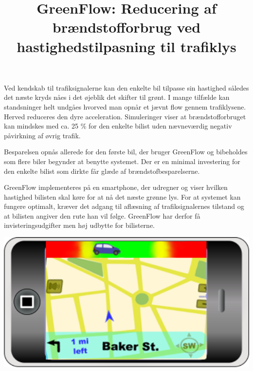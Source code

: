 \documentclass{article}
\title{GreenFlow: Reducering af brændstofforbrug ved hastighedstilpasning til trafiklys}
\date{}
\begin{document}
\maketitle

\noindent Ved kendskab til trafiksignalerne kan den enkelte bil tilpasse sin hastighed således det næste kryds nåes i det øjeblik det skifter til grønt.
I mange tilfælde kan standsninger helt undgåes hvorved man opnår et jævnt flow gennem trafiklysene.
Herved reduceres den dyre acceleration.
Simuleringer viser at brændstofforbruget kan mindskes med ca. 25 \% for den enkelte bilist uden nævneværdig negativ påvirkning af øvrig trafik.

\noindent
Besparelsen opnås allerede for den første bil, der bruger GreenFlow og bibeholdes som flere biler begynder at benytte systemet. 
Der er en minimal investering for den enkelte bilist som dirkte får glæde af brændstofbesparelserne.


\noindent GreenFlow implementeres på en smartphone, der udregner og viser hvilken hastighed bilisten skal køre for at nå det næste grønne lys.
For at systemet kan fungere optimalt, kræver det adgang til aflæsning af trafiksignalernes tilstand og at bilisten angiver den rute han vil følge.
GreenFlow har derfor få invisteringsudgifter men høj udbytte for bilisterne.

\vspace{15mm}
\includegraphics[width=1\textwidth]{images/product.png}
\end{document}
